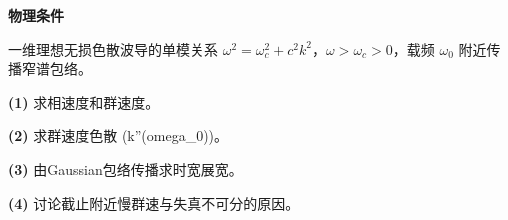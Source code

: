 \textbf{物理条件}\par 一维理想无损色散波导的单模关系 \(\omega^2=\omega_c^2+c^2k^2\)，\(\omega>\omega_c>0\)，载频 \(\omega_0\) 附近传播窄谱包络。
\par\noindent\textbf{(1)} 求相速度和群速度。
\par\noindent\textbf{(2)} 求群速度色散 (k''(omega\_0))。
\par\noindent\textbf{(3)} 由Gaussian包络传播求时宽展宽。
\par\noindent\textbf{(4)} 讨论截止附近慢群速与失真不可分的原因。
